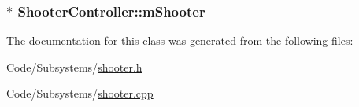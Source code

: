 \hypertarget{class_shooter_controller_a7c78bd9820decf6e74f4c35153175ef1}{
\subsubsection[{m\-Shooter}]{$\ast$ {\bf \-Shooter\-Controller\-::m\-Shooter}}}\label{class_shooter_controller_a7c78bd9820decf6e74f4c35153175ef1}


\-The documentation for this class was generated from the following files\-:\begin{DoxyCompactItemize}
\item 
\-Code/\-Subsystems/\hyperlink{shooter_8h}{shooter.\-h}\item 
\-Code/\-Subsystems/\hyperlink{shooter_8cpp}{shooter.\-cpp}\end{DoxyCompactItemize}
